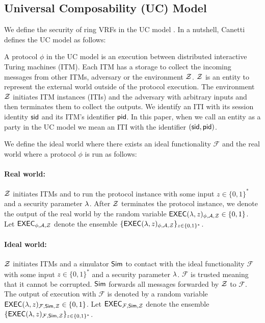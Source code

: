 

\subsection{Universal Composability (UC) Model}
\label{subsec:uc_background}
We define the security of ring VRFs in the UC model \cite{canetti1,canetti2}. In a nutshell, Canetti \cite{canetti1,canetti2} defines the UC model as follows:

A protocol $ \phi $ in the UC model is an execution between distributed interactive Turing machines (ITM). Each ITM has a storage to collect the incoming messages from other ITMs, adversary \adv or the environment $ \mathcal{Z} $. $ \mathcal{Z} $ is an entity to represent the external world outside of the protocol execution.  The environment $ \mathcal{Z} $ initiates ITM instances (ITIs) and the adversary \adv with arbitrary inputs and then terminates them to collect the outputs.
We identify an ITI with its session identity $ \textsf{sid} $ and its ITM's identifier $ \textsf{pid} $. In this paper, when we call an entity as a party in the UC model we mean an ITI with the identifier $ (\textsf{sid}, \textsf{pid}) $.

We define the ideal world where there exists an ideal functionality $ \mathcal{F} $ and the real world where a protocol $ \phi $ is run as follows:

\paragraph{Real world:} $ \mathcal{Z} $ initiates ITMs and \adv to run the protocol instance with some input $ z \in \{0,1\}^* $  and a security parameter $ \lambda $. After $ \mathcal{Z} $ terminates the protocol instance, we denote the output of the real world by the random variable $ \mathsf{EXEC}(\lambda, z)_{\phi, \mathcal{A}, \mathcal{Z}} \in \{0,1\} $. Let $ \mathsf{EXEC}_{\phi, \mathcal{A}, \mathcal{Z}} $ denote the ensemble $ \{\mathsf{EXEC}(\lambda, z)_{\phi, \mathcal{A}, \mathcal{Z}} \}_{z \in \{0,1\}^*} $.

\paragraph{Ideal world:} $ \mathcal{Z} $ initiates ITMs and a simulator $ \mathsf{Sim} $ to contact with the ideal functionality $ \mathcal{F} $ with some input $ z \in \{0,1\}^* $  and a security parameter $ \lambda $. $ \mathcal{F} $ is trusted meaning that it cannot be corrupted.
$ \mathsf{Sim} $ forwards all messages forwarded by $ \mathcal{Z} $ to $ \mathcal{F} $. The output of execution with $ \mathcal{F} $ is denoted by a random variable $ \mathsf{EXEC}(\lambda, z)_{\mathcal{F},\mathsf{Sim}, \mathcal{Z}} \in \{0,1\}$.  Let $ \mathsf{EXEC}_{\mathcal{F},\mathsf{Sim}, \mathcal{Z}} $ denote the ensemble $ \{\mathsf{EXEC}(\lambda, z)_{\mathcal{F}, \mathsf{Sim}, \mathcal{Z}} \}_{z \in \{0,1\}^*} $.

